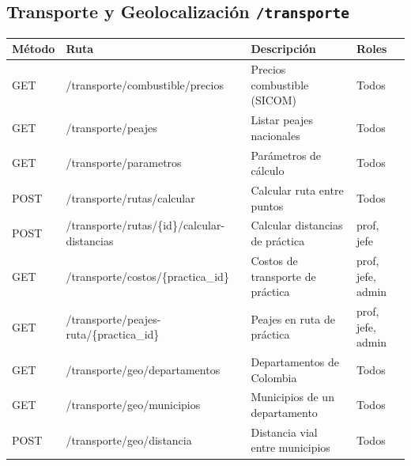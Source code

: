 \documentclass[12pt,a4paper]{article}
\begin{document}
\subsection{Transporte y Geolocalización \texttt{/transporte}}
\begin{longtable}{>{\ttfamily}p{1.5cm} >{\ttfamily}p{6.5cm} p{3.5cm} p{2cm}}
  \toprule
  \textbf{Método} & \textbf{Ruta} & \textbf{Descripción} & \textbf{Roles} \\
  \midrule
  GET    & /transporte/combustible/precios & Precios combustible (SICOM) & Todos \\
  GET    & /transporte/peajes & Listar peajes nacionales & Todos \\
  GET    & /transporte/parametros & Parámetros de cálculo & Todos \\
  POST   & /transporte/rutas/calcular & Calcular ruta entre puntos & Todos \\
  POST   & /transporte/rutas/\{id\}/calcular-distancias & Calcular distancias de práctica & prof, jefe \\
  GET    & /transporte/costos/\{practica\_id\} & Costos de transporte de práctica & prof, jefe, admin \\
  GET    & /transporte/peajes-ruta/\{practica\_id\} & Peajes en ruta de práctica & prof, jefe, admin \\
  GET    & /transporte/geo/departamentos & Departamentos de Colombia & Todos \\
  GET    & /transporte/geo/municipios & Municipios de un departamento & Todos \\
  POST   & /transporte/geo/distancia & Distancia vial entre municipios & Todos \\
  \bottomrule
\end{longtable}

\end{document}

